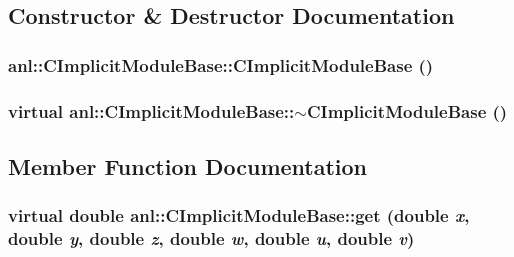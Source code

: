 \subsection{Constructor \& Destructor Documentation}
\hypertarget{classanl_1_1CImplicitModuleBase_a2179d89decfc65ec3f7dc2bfea98372d}{
\subsubsection[{CImplicitModuleBase}]{\setlength{\rightskip}{0pt plus 5cm}anl::CImplicitModuleBase::CImplicitModuleBase ()}}
\label{classanl_1_1CImplicitModuleBase_a2179d89decfc65ec3f7dc2bfea98372d}
\hypertarget{classanl_1_1CImplicitModuleBase_aa048225a76c86233b476ca598ed1cb01}{
\subsubsection[{$\sim$CImplicitModuleBase}]{\setlength{\rightskip}{0pt plus 5cm}virtual anl::CImplicitModuleBase::$\sim$CImplicitModuleBase ()}}
\label{classanl_1_1CImplicitModuleBase_aa048225a76c86233b476ca598ed1cb01}


\subsection{Member Function Documentation}
\hypertarget{classanl_1_1CImplicitModuleBase_aa40b7d54572197612a4fea44b63447eb}{
\subsubsection[{get}]{\setlength{\rightskip}{0pt plus 5cm}virtual double anl::CImplicitModuleBase::get (double {\em x}, \/  double {\em y}, \/  double {\em z}, \/  double {\em w}, \/  double {\em u}, \/  double {\em v})}}
\label{classanl_1_1CImplicitModuleBase_aa40b7d54572197612a4fea44b63447eb}


